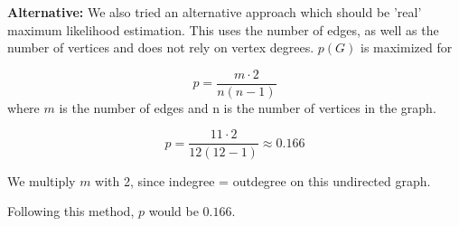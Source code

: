 \begin{enumerate}
	
	
\textbf{Alternative:}
We also tried an alternative approach which should be 'real' maximum likelihood estimation.  This uses the number of edges,  as well as the number of vertices and does not rely on vertex degrees.
$p(G)$ is maximized for 

\begin{equation}
p = \frac{m \cdot 2}{n(n-1)}
\end{equation}
where $m$ is the number of edges and n is the number of vertices in the graph.

\begin{equation}
p = \frac{11 \cdot 2}{12(12-1)} \approx 0.166
\end{equation}

We multiply $m$ with 2,  since indegree = outdegree on this undirected graph.

Following this method,  $p$ would be $0.166$.
	
	
	
\end{enumerate}